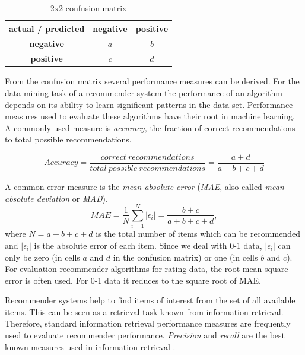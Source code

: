 \documentclass[nojss]{jss}
\begin{document}
\begin{table}[tbp]
\caption{2x2 confusion matrix
\label{tab_confusion}
}
\center
\begin{tabular}{|c||c|c|}
\hline
{\bf actual / predicted} & {\bf negative}  & {\bf positive} \\
\hline
\hline
{\bf negative} & $a$ & $b$ \\
\hline
{\bf positive} & $c$ & $d$ \\
\hline
\end{tabular}
\end{table}

From the confusion matrix several performance measures can be derived.
For the data mining task of a recommender system
the performance of an algorithm depends on its ability
to learn significant patterns in the data set.
Performance measures used to evaluate these algorithms
have their root in machine learning.
A commonly used measure is
{\em accuracy,} the fraction of correct
recommendations to total possible recommendations.

\begin{equation}
\mathit{Accuracy} = \frac{\mathit{correct\ recommendations}}{\mathit{total\ possible\ recommendations}}
=  \frac{a+d}{a+b+c+d}
\label{accur}
\end{equation}

A common error measure is the {\em mean absolute error} ({\em MAE}, also called {\em mean absolute deviation} or {\em MAD}).
\begin{equation}
\mathit{MAE} = \frac{1}{N}\sum_{i=1}^N{|\epsilon_i|} = \frac{b+c}{a+b+c+d},
\label{mae}
\end{equation}
where $N = a+b+c+d$ is the total number of items
which can be recommended and $|\epsilon_i|$ is the
absolute error of each item.
Since we deal with 0-1 data, $|\epsilon_i|$ can only be zero (in cells $a$ and $d$ in the confusion matrix) or one (in cells $b$ and $c$).
For evaluation recommender algorithms for rating data, the root mean square
error is often used. For 0-1 data it reduces to the square
root of MAE.

Recommender systems help to find items of interest from the set of all
available items. This can be seen as a retrieval task known from
information retrieval. Therefore, standard information retrieval
performance measures are frequently used to evaluate recommender performance.
{\em Precision} and {\em recall} are the best known measures used in
information retrieval \citep{recommender:Salton:1983,recommender:Rijsbergen:1979}.
\end{document}
